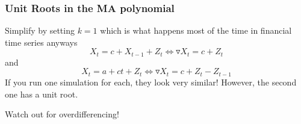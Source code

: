 \documentclass{beamer}
\begin{document}

\begin{frame}[fragile]
\frametitle{Unit Roots in the MA polynomial}

Simplify by setting $k=1$ which is what happens most of the time in financial time series anyways
\[
X_t = c + X_{t-1} + Z_t \iff \triangledown X_t = c + Z_t
\]
and
\[
X_t = a + c t + Z_t \iff \triangledown X_t = c +  Z_t - Z_{t-1}
\]
If you run one simulation for each, they look very similar! However, the second one has a unit root. 
\newline

Watch out for overdifferencing!
\end{frame}
\end{document}

